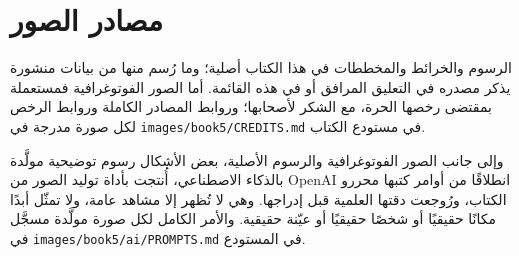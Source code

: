 \chapter*{مصادر الصور}

الرسوم والخرائط والمخططات في هذا الكتاب أصلية؛ وما رُسم منها من بيانات
منشورة يذكر مصدره في التعليق المرافق أو في هذه القائمة. أما الصور
الفوتوغرافية فمستعملة بمقتضى رخصها الحرة، مع الشكر لأصحابها؛ وروابط المصادر
الكاملة وروابط الرخص لكل صورة مدرجة في \texttt{images/book5/CREDITS.md} في
مستودع الكتاب.

\bigskip
وإلى جانب الصور الفوتوغرافية والرسوم الأصلية، بعض الأشكال رسوم توضيحية
مولَّدة بالذكاء الاصطناعي، أُنتجت بأداة توليد الصور من OpenAI انطلاقًا من
أوامر كتبها محررو الكتاب، ورُوجعت دقتها العلمية قبل إدراجها. وهي لا تُظهر
إلا مشاهد عامة، ولا تمثّل أبدًا مكانًا حقيقيًا أو شخصًا حقيقيًا أو عيّنة
حقيقية. والأمر الكامل لكل صورة مولَّدة مسجَّل في
\texttt{images/book5/ai/PROMPTS.md} في المستودع.

